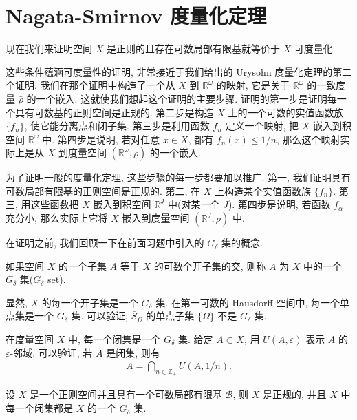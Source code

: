 \documentclass[../../main.tex]{subfiles}
\begin{document}
\section{Nagata-Smirnov 度量化定理}\label{section:ch06-nagata-smirnov}

现在我们来证明空间 $X$ 是正则的且存在可数局部有限基就等价于 $X$ 可度量化.

这些条件蕴涵可度量性的证明, 非常接近于我们给出的 Urysohn 度量化定理的第二个证明. 我们在那个证明中构造了一个从 $X$ 到 $\mathbb{R}^\omega$ 的映射, 它是关于 $\mathbb{R}^\omega$ 的一致度量 $\bar{\rho}$ 的一个嵌入. 这就使我们想起这个证明的主要步骤. 证明的第一步是证明每一个具有可数基的正则空间是正规的. 第二步是构造 $X$ 上的一个可数的实值函数族 $\{f_n\}$, 使它能分离点和闭子集. 第三步是利用函数 $f_n$ 定义一个映射, 把 $X$ 嵌入到积空间 $\mathbb{R}^\omega$ 中. 第四步是说明, 若对任意 $x\in X$, 都有 $f_n(x)\leqslant 1/n$, 那么这个映射实际上是从 $X$ 到度量空间 $(\mathbb{R}^\omega,\bar{\rho})$ 的一个嵌入.

为了证明一般的度量化定理, 这些步骤的每一步都要加以推广. 第一, 我们证明具有可数局部有限基的正则空间是正规的. 第二, 在 $X$ 上构造某个实值函数族 $\{f_n\}$. 第三, 用这些函数把 $X$ 嵌入到积空间 $\mathbb{R}^J$ 中(对某一个 $J$). 第四步是说明, 若函数 $f_\alpha$ 充分小, 那么实际上它将 $X$ 嵌入到度量空间 $(\mathbb{R}^J,\bar{\rho})$ 中.

在证明之前, 我们回顾一下在前面习题中引入的 $G_\delta$ 集的概念.

\begin{definition}\label{definition:ch06-g-delta}
如果空间 $X$ 的一个子集 $A$ 等于 $X$ 的可数个开子集的交, 则称 $A$ 为 $X$ 中的一个 $G_\delta$ 集($G_\delta$ set).
\end{definition}

\begin{examples}
显然, $X$ 的每一个开子集是一个 $G_\delta$ 集. 在第一可数的 Hausdorff 空间中, 每一个单点集是一个 $G_\delta$ 集. 可以验证, $\bar{S}_\Omega$ 的单点子集 $\{\Omega\}$ 不是 $G_\delta$ 集.
\end{examples}

\begin{examples}
在度量空间 $X$ 中, 每一个闭集是一个 $G_\delta$ 集. 给定 $A\subset X$, 用 $U(A,\varepsilon)$ 表示 $A$ 的 $\varepsilon$-邻域. 可以验证, 若 $A$ 是闭集, 则有
\begin{align*}
A=\bigcap_{n\in\mathbb{Z}_+}U(A,1/n).
\end{align*}
\end{examples}

\begin{lemma}\label{lemma:ch06-regular-countable-locally-finite-normal}
设 $X$ 是一个正则空间并且具有一个可数局部有限基 $\mathcal{B}$, 则 $X$ 是正规的, 并且 $X$ 中每一个闭集都是 $X$ 的一个 $G_\delta$ 集.
\end{lemma}
\end{document}
